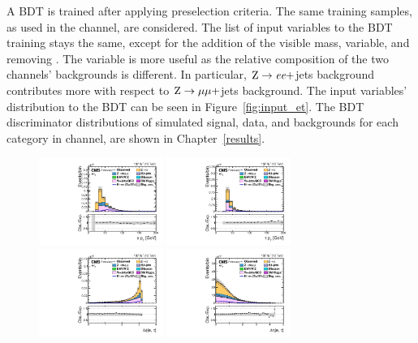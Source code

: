 A BDT is trained after applying preselection criteria. The same training samples, as used in the \muhad channel, are considered. The list of input variables to the BDT training stays the same, except for the addition of the visible mass, \mvis variable, and removing \ptvecmiss. The \mvis variable is more useful as the relative composition of the two channels' backgrounds is different. In particular, $\text{Z} \to \textit{e} \textit{e}+$jets background contributes more with respect to $\text{Z} \to \mu \mu+$jets background. The input variables' distribution to the BDT can be seen in Figure~\ref{fig:input_et}. The BDT discriminator distributions of simulated signal, data, and backgrounds for each category in \ehad channel, are shown in Chapter~\ref{results}.

\begin{figure}[htbp!]
  \centering
  \includegraphics[width=0.36\textwidth]{plots/chapter6/etau/ePt.pdf}
  \includegraphics[width=0.36\textwidth]{plots/chapter6/etau/tPt.pdf}\\
  \includegraphics[width=0.36\textwidth]{plots/chapter6/etau/dPhiETau.pdf}
  \includegraphics[width=0.36\textwidth]{plots/chapter6/etau/dEtaETau.pdf}\\

\end{figure}
